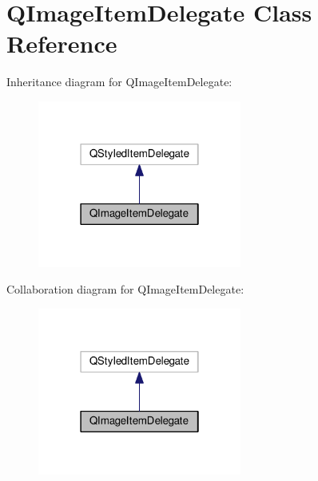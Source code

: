 \hypertarget{class_q_image_item_delegate}{}\section{Q\+Image\+Item\+Delegate Class Reference}
\label{class_q_image_item_delegate}


Inheritance diagram for Q\+Image\+Item\+Delegate\+:\nopagebreak
\begin{figure}[H]
\begin{center}
\leavevmode
\includegraphics[width=190pt]{class_q_image_item_delegate__inherit__graph}
\end{center}
\end{figure}


Collaboration diagram for Q\+Image\+Item\+Delegate\+:\nopagebreak
\begin{figure}[H]
\begin{center}
\leavevmode
\includegraphics[width=190pt]{class_q_image_item_delegate__coll__graph}
\end{center}
\end{figure}
